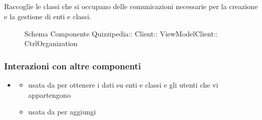 \subsection{}
Raccoglie le classi che si occupano delle comunicazioni necessarie per la creazione e la gestione di enti e classi.
\begin{figure}[H]
\centering
\noindent{}
\caption[Schema Componente CtrlOrganization]{Schema Componente Quizzipedia:: Client:: ViewModelClient:: CtrlOrganization}
\end{figure}
\subsubsection{Interazioni con altre componenti}
\begin{itemize}
\item {}
\begin{itemize}
\item usata da  per ottenere i dati su enti e classi e gli utenti che vi appartengono
\item usata da  per aggiungi
\end{itemize}
\end{itemize}
